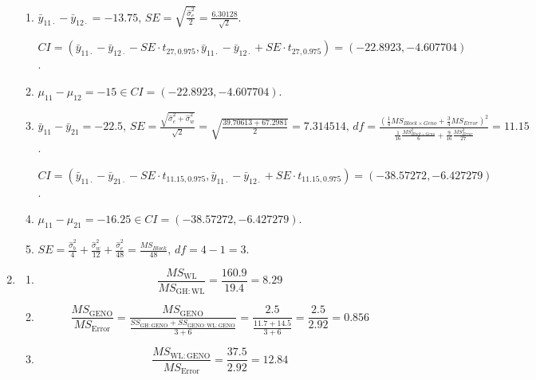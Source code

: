 \documentclass{article}
\begin{document}
\begin{enumerate}[leftmargin = 0 em, label = \arabic*., font = \bfseries]
\begin{enumerate}
		\item 
		$\bar{y}_{11 \cdot} - \bar{y}_{12 \cdot} = -13.75,\, SE = \sqrt{\frac{\hat{\sigma}_{e}^2}{2}} = \frac{6.30128}{\sqrt{2}}$. 

		$CI = (\bar{y}_{11 \cdot} - \bar{y}_{12 \cdot} - SE \cdot t_{27, 0.975} ,\bar{y}_{11 \cdot} - \bar{y}_{12 \cdot} + SE \cdot t_{27, 0.975} ) = ( -22.8923, -4.607704)$. 
		\item 
		$\mu_{11} - \mu_{12} = -15 \in CI = (-22.8923, -4.607704)$.

		\item 
		$\bar{y}_{11} - \bar{y}_{21} = -22.5,\, SE = \frac{\sqrt{\hat{\sigma}_e^2 + \hat{\sigma}_w^2}}{\sqrt{2}} = \sqrt{\frac{39.70613 + 67.2981}{2}} =  7.314514,\, df = \frac{\left( \frac{1}{4} MS_{Block \times Geno} + \frac{3}{4} MS_{Error} \right)^2 }{\frac{1}{16} \frac{MS_{Block \times Geno}^2}{6} + \frac{9}{16} \frac{MS_{Error}^2}{27}} = 11.15$. 

		$CI = (\bar{y}_{11 \cdot} - \bar{y}_{21 \cdot} - SE \cdot t_{11.15, 0.975} ,\bar{y}_{11 \cdot} - \bar{y}_{12 \cdot} + SE \cdot t_{11.15, 0.975} ) = ( -38.57272,-6.427279)$.

		\item 
		$\mu_{11} - \mu_{21} = -16.25 \in CI = ( -38.57272,-6.427279)$.

		\item 
		$SE = \frac{\hat{\sigma}_b^2}{4}+\frac{\hat{\sigma}_w^2}{12} + \frac{\hat{\sigma}_e^2}{48} = \frac{MS_{Block}}{48},\, df = 4-1 = 3$. 
	\end{enumerate}
	

	\item 
	\begin{enumerate}
		\item 
		\[\frac{MS_{\mathrm{WL}}}{MS_{\mathrm{GH:WL}}} = \frac{160.9}{19.4} = 8.29\]

		\item 
		\[\frac{MS_{\mathrm{GENO}}}{MS_{\mathrm{Error}}} = \frac{MS_{\mathrm{GENO}}}{\frac{SS_{\mathrm{GH:GENO}} + SS_{\mathrm{GENO : WL : GENO}}} {3+6}} = \frac{2.5}{\frac{11.7 + 14.5}{3+6}} = \frac{2.5}{2.92} = 0.856\]

		\item
		\[\frac{MS_{\mathrm{WL:GENO}}}{MS_{\mathrm{Error}}} = \frac{37.5}{2.92} = 12.84\] 
	\end{enumerate}


\end{enumerate}
\end{document}
